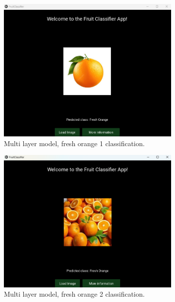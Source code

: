 \documentclass[conference]{IEEEtran}
\begin{document}
\begin{figure}[h]
    \begin{subfigure}[b]{0.48\linewidth}
        \centering
        \includegraphics[width=\linewidth]{Mlayer orage1.png}
        \caption{Multi layer model, fresh orange 1 classification.}
        \label{figFA}
    \end{subfigure}
    \hfill
    \begin{subfigure}[b]{0.48\linewidth}
        \centering
        \includegraphics[width=\linewidth]{Mlayer orage2.png}
        \caption{Multi layer model, fresh orange 2 classification.}
        \label{figFB}
    \end{subfigure}
    \hfill
    \begin{subfigure}[b]{0.48\linewidth}

\end{subfigure}
\end{figure}
\end{document}

